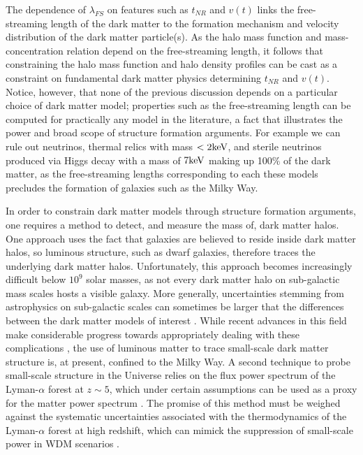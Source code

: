 The dependence of $\lambda_{FS}$ on features such as $t_{NR}$ and $v\left(t\right)$ links the free-streaming length of the dark matter to the formation mechanism and velocity distribution of the dark matter particle(s). As the halo mass function and mass-concentration relation depend on the free-streaming length, it follows that constraining the halo mass function and halo density profiles can be cast as a constraint on fundamental dark matter physics determining $t_{NR}$ and $v\left(t\right)$. Notice, however, that none of the previous discussion depends on a particular choice of dark matter model; properties such as the free-streaming length can be computed for practically any model in the literature, a fact that illustrates the power and broad scope of structure formation arguments. For example we can rule out neutrinos, thermal relics with mass $< 2 \rm{keV}$, and sterile neutrinos produced via Higgs decay with a mass of $7 \rm{keV}$ \cite{Viel13,AbazaijanKusenko19} making up 100$\%$ of the dark matter, as the free-streaming lengths corresponding to each these models precludes the formation of galaxies such as the Milky Way. 

In order to constrain dark matter models through structure formation arguments, one requires a method to detect, and measure the mass of, dark matter halos. One approach uses the fact that galaxies are believed to reside inside dark matter halos, so luminous structure, such as dwarf galaxies, therefore traces the underlying dark matter halos. Unfortunately, this approach becomes increasingly difficult below $10^9$ solar masses, as not every dark matter halo on sub-galactic mass scales hosts a visible galaxy. More generally, uncertainties stemming from astrophysics on sub-galactic scales can sometimes be larger that the differences between the dark matter models of interest \cite{Nierenberg++16}. While recent advances in this field make considerable progress towards appropriately dealing with these complications \cite{Nadler++19}, the use of luminous matter to trace small-scale dark matter structure is, at present, confined to the Milky Way. A second technique to probe small-scale structure in the Universe relies on the flux power spectrum of the Lyman-$\alpha$ forest at $z \sim 5$, which under certain assumptions can be used as a proxy for the matter power spectrum \cite{Viel13,Irsic++17}. The promise of this method must be weighed against the systematic uncertainties associated with the thermodynamics of the Lyman-$\alpha$ forest at high redshift, which can mimick the suppression of small-scale power in WDM scenarios \cite{Garzilli++19}. 

